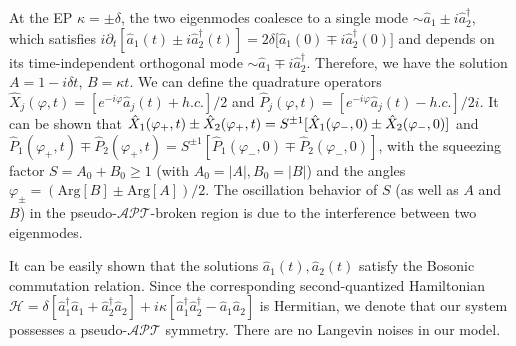 \documentclass[twocolumn,prl,floatfix,citeautoscript,nofootinbib,superscriptaddress]{revtex4}
\begin{document}
\begin{widetext}
At the EP $\kappa =\pm \delta $, the two eigenmodes coalesce to a single
mode $\sim \hat{a}_{1}\pm i\hat{a}_{2}^{\dag }$, which satisfies $i\partial
_{t}[\hat{a}_{1}(t)\pm i\hat{a}_{2}^{\dag }(t)]=2\delta \lbrack \hat{a}%
_{1}(0)\mp i\hat{a}_{2}^{\dag }(0)]$ and depends on its time-independent
orthogonal mode $\sim \hat{a}_{1}\mp i\hat{a}_{2}^{\dag }$. Therefore, we
have the solution $A=1-i\delta t$, $B=\kappa t$. We can define the
quadrature operators $\hat{X}_{j}(\varphi ,t)=[e^{-i\varphi }\hat{a}%
_{j}(t)+h.c.]/2$ and $\hat{P}_{j}(\varphi ,t)=[e^{-i\varphi }\hat{a}%
_{j}(t)-h.c.]/2i$. It can be shown that $\hat{X}_{1}(\varphi _{+},t)\pm \hat{%
X}_{2}(\varphi _{+},t)=S^{\pm 1}[\hat{X}_{1}(\varphi _{-},0)\pm \hat{X}%
_{2}(\varphi _{-},0)]$ and $\hat{P}_{1}(\varphi _{+},t)\mp \hat{P}%
_{2}(\varphi _{+},t)=S^{\pm 1}[\hat{P}_{1}(\varphi _{-},0)\mp \hat{P}%
_{2}(\varphi _{-},0)]$, with the squeezing factor $S=A_{0}+B_{0}\geq 1$
(with $A_{0}=|A|,B_{0}=|B|$) and the angles $\varphi _{\pm }=(\mathrm{Arg}%
[B]\pm \mathrm{Arg}[A])/2$. The oscillation behavior of $S$ (as well as $A$
and $B$) in the pseudo-$\mathcal{APT}$-broken region is due to the
interference between two eigenmodes.

It can be easily shown that the solutions $\hat{a}_{1}(t),\hat{a}_{2}(t)$
satisfy the Bosonic commutation relation. Since the corresponding
second-quantized Hamiltonian $\mathcal{H}=\delta \left[ \hat{a}_{1}^{\dag }%
\hat{a}_{1}+\hat{a}_{2}^{\dag }\hat{a}_{2}\right] +i\kappa \left[ \hat{a}%
_{1}^{\dag }\hat{a}_{2}^{\dag }-\hat{a}_{1}\hat{a}_{2}\right] $ is
Hermitian, we denote that our system possesses a pseudo-$\mathcal{APT}$
symmetry. There are no Langevin noises in our model.


\end{widetext}
\end{document}
